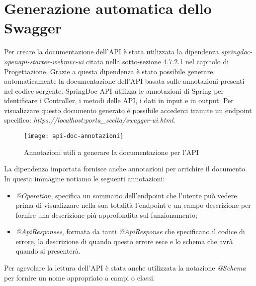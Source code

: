 \section{Generazione automatica dello Swagger}
Per creare la documentazione dell'API è stata utilizzata la dipendenza \textit{springdoc-openapi-starter-webmvc-ui} citata nella sotto-sezione \hyperlink{doc-api}{4.7.2.1} nel capitolo di Progettazione. Grazie a questa dipendenza è stato possibile generare automaticamente la documentazione dell'API basata sulle annotazioni presenti nel codice sorgente. SpringDoc API utilizza le annotazioni di Spring per identificare i Controller, i metodi delle API, i dati in input e in output. Per visualizzare questo documento generato è possibile accederci tramite un endpoint specifico: \textit{https://localhost:porta\_scelta/swagger-ui.html}.
\begin{figure}[H] 
    \centering 
    \texttt{[image: api-doc-annotazioni]} 
    \caption{Annotazioni utili a generare la documentazione per l'API}
\end{figure}
\noindent La dipendenza importata fornisce anche annotazioni per arrichire il documento. In questa immagine notiamo le seguenti annotazioni:
\begin{itemize}
\item \textit{@Operation}, specifica un sommario dell'endpoint che l'utente può vedere prima di visualizzare nella sua totalità l'endpoint e un campo descrizione per fornire una descrizione più approfondita sul funzionamento;
\item \textit{@ApiResponses}, formata da tanti \textit{@ApiResponse} che specificano il codice di errore, la descrizione di quando questo errore esce e lo schema che avrà quando si presenterà.
\end{itemize}
Per agevolare la lettura dell'API è stata anche utilizzata la notazione \textit{@Schema} per fornire un nome appropriato a campi o classi.






